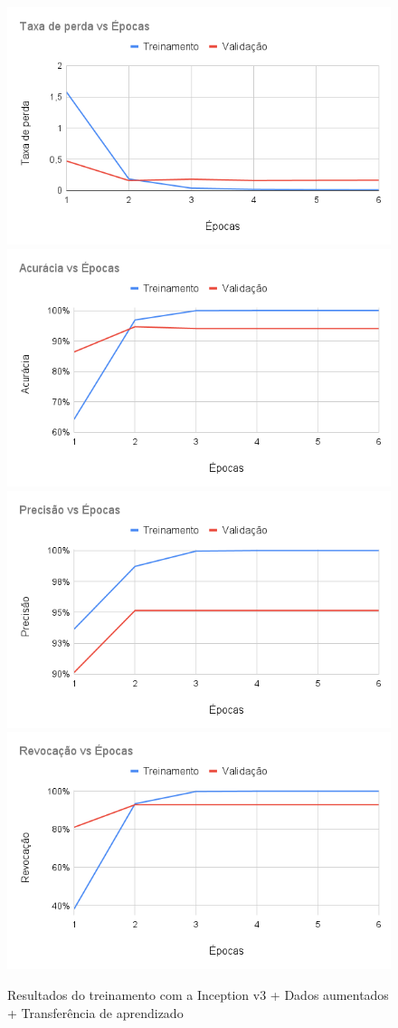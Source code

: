 \documentclass[
	12pt,				%
	oneside,			%
	a4paper,			%
	english,			%
	brazil				%
	]{abntex2ppgsi}
\begin{document}
\begin{figure}[H]
    \centering
    \caption{Resultados do treinamento com a Inception v3 + Dados aumentados + Transferência de aprendizado}
    \includegraphics[width=.50\textwidth]{imagens/resultados_discussao/architecture/inception_v3/transfer_learning/augmented/perda.png}\hfill
    \includegraphics[width=.50\textwidth]{imagens/resultados_discussao/architecture/inception_v3/transfer_learning/augmented/acuracia.png}\bigbreak    \includegraphics[width=.50\textwidth]{imagens/resultados_discussao/architecture/inception_v3/transfer_learning/augmented/precisao.png}\hfill
    \includegraphics[width=.50\textwidth]{imagens/resultados_discussao/architecture/inception_v3/transfer_learning/augmented/revocacao.png}
    \label{fig:inception_v3_augmented_transfer_learning}
\end{figure}
\end{document}
